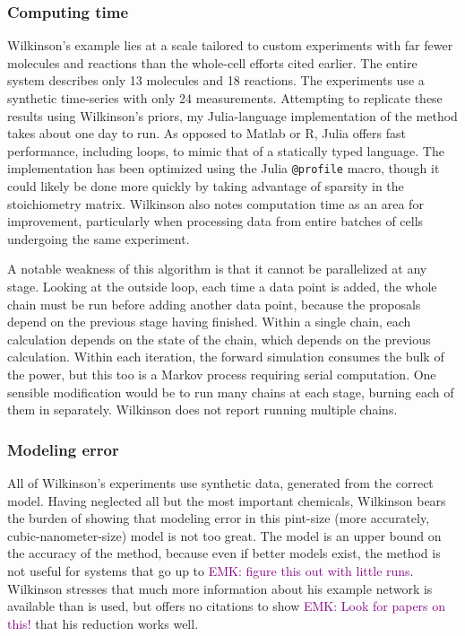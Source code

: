 \documentclass{article}
\newcommand\EMK[1]{\textcolor{purple}{EMK: #1}}
\begin{document}
\subsubsection{Computing time}
Wilkinson's example lies at a scale tailored to custom experiments with far fewer molecules and reactions than the whole-cell efforts cited earlier. The entire system describes only 13 molecules and 18 reactions. The experiments use a synthetic time-series with only 24 measurements. Attempting to replicate these results using Wilkinson's priors, my Julia-language implementation of the method takes about one day to run. As opposed to Matlab or R, Julia offers fast performance, including loops, to mimic that of a statically typed language. The implementation has been optimized using the Julia \texttt{@profile} macro, though it could likely be done more quickly by taking advantage of sparsity in the stoichiometry matrix. Wilkinson also notes computation time as an area for improvement, particularly when processing data from entire batches of cells undergoing the same experiment.

A notable weakness of this algorithm is that it cannot be parallelized at any stage. Looking at the outside loop, each time a data point is added, the whole chain must be run before adding another data point, because the proposals depend on the previous stage having finished. Within a single chain, each calculation depends on the state of the chain, which depends on the previous calculation. Within each iteration, the forward simulation consumes the bulk of the power, but this too is a Markov process requiring serial computation. One sensible modification would be to run many chains at each stage, burning each of them in separately. Wilkinson does not report running multiple chains.

\subsubsection{Modeling error}
All of Wilkinson's experiments use synthetic data, generated from the correct model. Having neglected all but the most important chemicals, Wilkinson bears the burden of showing that modeling error in this pint-size (more accurately, cubic-nanometer-size) model is not too great. The model is an upper bound on the accuracy of the method, because even if better models exist, the method is not useful for systems that go up to \EMK{figure this out with little runs}. Wilkinson stresses that much more information about his example network is available than is used, but offers no citations to show \EMK{Look for papers on this!} that his reduction works well.
\end{document}
